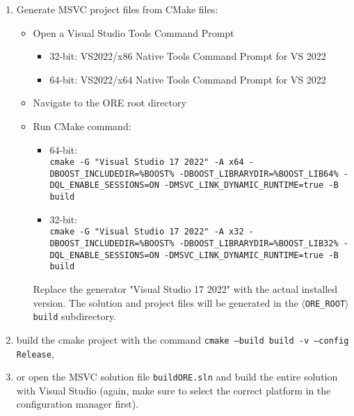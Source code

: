 \begin{enumerate}

\item Generate MSVC project files from CMake files:
\begin{itemize}
\item Open a Visual Studio Tools Command Prompt
\begin{itemize}
\item 32-bit: VS2022/x86 Native Tools Command Prompt for VS 2022
\item 64-bit: VS2022/x64 Native Tools Command Prompt for VS 2022
\end{itemize}
\item Navigate to the ORE root directory
\item Run CMake command:
\begin{itemize}
\item 64-bit: \\
{\tt cmake -G "Visual Studio 17 2022" -A x64 -DBOOST\_INCLUDEDIR=\%BOOST\% -DBOOST\_LIBRARYDIR=\%BOOST\_LIB64\% -DQL\_ENABLE\_SESSIONS=ON -DMSVC\_LINK\_DYNAMIC\_RUNTIME=true -B build}
\item 32-bit: \\
{\tt cmake -G "Visual Studio 17 2022" -A x32 -DBOOST\_INCLUDEDIR=\%BOOST\% -DBOOST\_LIBRARYDIR=\%BOOST\_LIB32\% -DQL\_ENABLE\_SESSIONS=ON -DMSVC\_LINK\_DYNAMIC\_RUNTIME=true -B build}
\end{itemize}
Replace the generator "Visual Studio 17 2022" with the actual installed version.
The solution and project files will be generated in the {\tt $\langle$ORE\_ROOT$\rangle${\bs}build} subdirectory.
\end{itemize}

\item build the cmake project with the command {\tt cmake --build build -v --config Release},

\item or open the MSVC solution file {\tt build{\bs}ORE.sln} and build the entire solution with Visual Studio (again, make sure to select the correct platform in the configuration manager first).
\end{enumerate}



